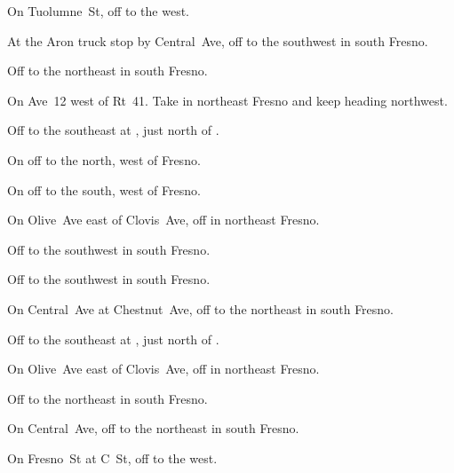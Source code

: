 
\begin{LocationList}

On Tuolumne~St, off   to the west.

At the Aron truck stop by Central~Ave, off   to the southwest in south Fresno.

Off   to the northeast in south Fresno.

On Ave~12 west of Rt~41.
Take   in northeast Fresno and keep heading northwest.

Off  to the southeast at , just north of .

On  off  to the north, west of Fresno.

On  off  to the south, west of Fresno.

On Olive~Ave east of Clovis~Ave, off   in northeast Fresno.

Off   to the southwest in south Fresno.

\Location{\GarageHQ \Garage}
Off   to the southwest in south Fresno.

On Central~Ave at Chestnut~Ave, off   to the northeast in south Fresno.

Off  to the southeast at , just north of .

On Olive~Ave east of Clovis~Ave, off   in northeast Fresno.

Off   to the northeast in south Fresno.

\Location{\RecruitmentAgency \Recruitment}
On Central~Ave, off   to the northeast in south Fresno.

On Fresno~St at C~St, off   to the west.

\end{LocationList}
